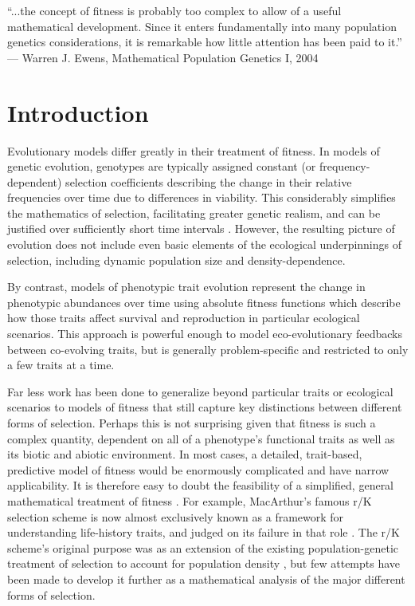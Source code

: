 \documentclass[11pt]{article}
\begin{document}
\newpage{}

``...the concept of fitness is probably too complex to allow of a useful mathematical development. Since it enters fundamentally into many population genetics considerations, it is remarkable how little attention has been paid to it.'' --- Warren J. Ewens, Mathematical Population Genetics I, 2004 

\section*{Introduction}

Evolutionary models differ greatly in their treatment of fitness. In models of genetic evolution, genotypes are typically assigned constant (or frequency-dependent) selection coefficients describing the change in their relative frequencies over time due to differences in viability. This considerably simplifies the mathematics of selection, facilitating greater genetic realism, and can be justified over sufficiently short time intervals \citep[p. 276]{ewens_2012}. However, the resulting picture of evolution does not include even basic elements of the ecological underpinnings of selection, including dynamic population size and density-dependence.

By contrast, models of phenotypic trait evolution represent the change in phenotypic abundances over time using absolute fitness functions which describe how those traits affect survival and reproduction in particular ecological scenarios. This approach is powerful enough to model eco-evolutionary feedbacks between co-evolving traits, but is generally problem-specific and restricted to only a few traits at a time.

Far less work has been done to generalize beyond particular traits or ecological scenarios to models of fitness that still capture key distinctions between different forms of selection. Perhaps this is not surprising given that fitness is such a complex quantity, dependent on all of a phenotype's functional traits \citep{violle_2007} as well as its biotic and abiotic environment. In most cases, a detailed, trait-based, predictive model of fitness would be enormously complicated and have narrow applicability. It is therefore easy to doubt the feasibility of a simplified, general mathematical treatment of fitness \citep[p. 276]{ewens_2012}. For example, MacArthur's famous r/K selection scheme is now almost exclusively known as a framework for understanding life-history traits, and judged on its failure in that role \citep{pianka_1970,stearns_1977,boyce_1984,reznick_2002}. The r/K scheme's original purpose was as an extension of the existing population-genetic treatment of selection to account for population density \citep{macarthur_1962}, but few attempts have been made to develop it further as a mathematical analysis of the major different forms of selection. 
\end{document}
